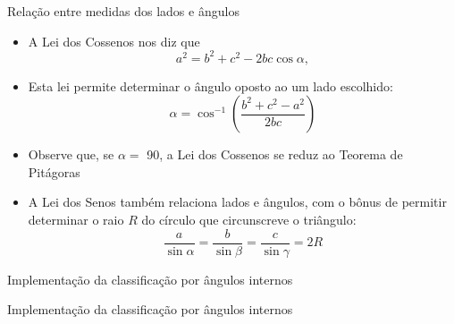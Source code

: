 \begin{frame}[fragile]{Relação entre medidas dos lados e ângulos}

    \begin{itemize}
        \item A Lei dos Cossenos nos diz que
        \[
            a^2 = b^2 + c^2 - 2bc\cos \alpha,
        \]
        \pause
        
        \item Esta lei permite determinar o ângulo oposto ao um lado escolhido:
        \[
            \alpha = \cos^{-1} \left(\frac{b^2 + c^2 - a^2}{2bc}\right)
        \]
        \pause
        
        \item Observe que, se $\alpha =$ 90\textdegree, a Lei dos Cossenos se reduz ao 
            Teorema de Pitágoras
        \pause

        \item A Lei dos Senos também relaciona lados e ângulos, com o bônus de permitir 
            determinar o raio $R$ do círculo que circunscreve o triângulo:
        \[
            \frac{a}{\sin \alpha} = \frac{b}{\sin \beta} = \frac{c}{\sin \gamma} = 2R
        \]
    \end{itemize}

\end{frame}

\begin{frame}[fragile]{Implementação da classificação por ângulos internos}
\end{frame}

\begin{frame}[fragile]{Implementação da classificação por ângulos internos}
\end{frame}
